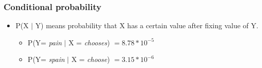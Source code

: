 \documentclass[handout]{beamer}
\begin{document}
\begin{frame}
\frametitle{Conditional probability}
\begin{itemize}[<+->]
\item P(X $\mid$ Y) means probability that X has a certain value after fixing value of Y.
\begin{itemize}[<+->]
\item P(Y= \textit{pain} $\mid$ X = \textit{chooses}) $= 8.78 * 10^{-5}$
\item P(Y= \textit{spain} $\mid$ X = \textit{choose}) $= 3.15 * 10^{-6}$
\end{itemize}
\end{itemize}
\end{frame}

%
%
%
%
%
\end{document}
